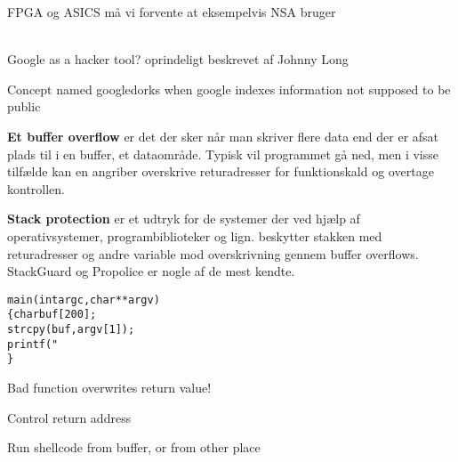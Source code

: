 \documentclass[Screen16to9,17pt]{foils}
\begin{document}

FPGA og ASICS må vi forvente at eksempelvis NSA bruger\\
{\footnotesize
{}\\ }




\begin{list2}
\item Google as a hacker tool? oprindeligt beskrevet af Johnny Long
\item Concept named googledorks when google indexes information not supposed to be public
\item {}
\end{list2}


\begin{list1}
\item {\bfseries Et buffer overflow}
er det der sker når man skriver flere data end der er afsat plads til
i en buffer, et dataområde. Typisk vil programmet gå ned, men i visse
tilfælde kan en angriber overskrive returadresser for funktionskald og
overtage kontrollen.
\item {\bfseries Stack protection}
er et udtryk for de systemer der ved hjælp af operativsystemer,
programbiblioteker og lign. beskytter stakken med returadresser og
andre variable mod overskrivning gennem buffer overflows. StackGuard
og Propolice er nogle af de mest kendte.
\end{list1}



\begin{alltt}\small
main(int argc, char **argv)
\{      char buf[200];
        strcpy(buf, argv[1]);
        printf("%s\textbackslash{}n",buf);
\}
\end{alltt}




\begin{list2}
\item Bad function overwrites return value!
\item Control return address
\item Run shellcode from buffer, or from other place
\end{list2}
\end{document}
